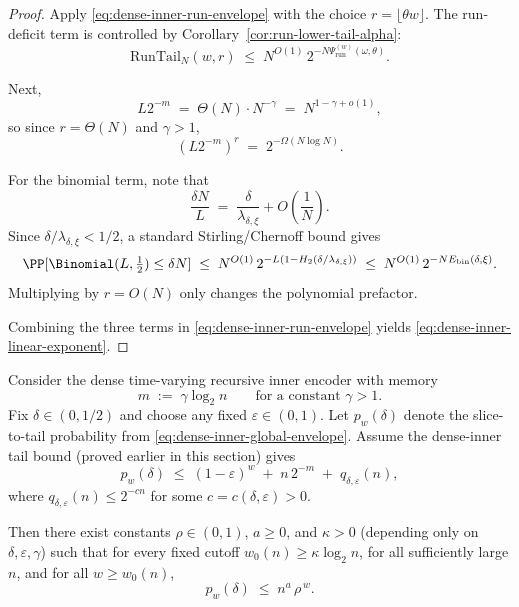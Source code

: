 \begin{proof}
Apply \eqref{eq:dense-inner-run-envelope} with the choice $r=\lfloor \theta w\rfloor$.
The run-deficit term is controlled by Corollary~\ref{cor:run-lower-tail-alpha}:
\[
\mathrm{RunTail}_N(w,r)
\;\le\;
N^{O(1)}\,2^{-N\Psi_{\mathrm{run}}^{(w)}(\omega,\theta)}.
\]

Next,
\[
L2^{-m}
\;=\;
\Theta(N)\cdot N^{-\gamma}
\;=\;
N^{1-\gamma+o(1)},
\]
so since $r=\Theta(N)$ and $\gamma>1$,
\[
(L2^{-m})^r
\;=\;
2^{-\Omega(N\log N)}.
\]

For the binomial term, note that
\[
\frac{\delta N}{L}
\;=\;
\frac{\delta}{\lambda_{\delta,\xi}}+O\!\left(\frac{1}{N}\right).
\]
Since \(\delta/\lambda_{\delta,\xi}<1/2\), a standard Stirling/Chernoff bound gives
\[
\PP[\Binomial(L,\tfrac12)\le \delta N]
\;\le\;
N^{O(1)}\,2^{-L\left(1-H_2(\delta/\lambda_{\delta,\xi})\right)}
\;\le\;
N^{O(1)}\,2^{-N E_{\mathrm{bin}}(\delta,\xi)}.
\]
Multiplying by $r=O(N)$ only changes the polynomial prefactor.

Combining the three terms in \eqref{eq:dense-inner-run-envelope} yields
\eqref{eq:dense-inner-linear-exponent}.
\end{proof}




\begin{corollary}
\label{cor:dense-inner-geometric-cutoff}
Consider the dense time-varying recursive inner encoder with memory
\[
m \;:=\; \gamma \log_2 n
\qquad\text{for a constant }\gamma>1.
\]
Fix $\delta\in(0,1/2)$ and choose any fixed $\varepsilon\in(0,1)$.
Let $p_w(\delta)$ denote the slice-to-tail probability from \eqref{eq:dense-inner-global-envelope}.
Assume the dense-inner tail bound (proved earlier in this section) gives
\begin{equation}
\label{eq:dense-three-term-recall}
p_w(\delta)
\;\le\;
(1-\varepsilon)^w \;+\; n\,2^{-m} \;+\; q_{\delta,\varepsilon}(n),
\end{equation}
where $q_{\delta,\varepsilon}(n)\le 2^{-c n}$ for some $c=c(\delta,\varepsilon)>0$.

Then there exist constants $\rho\in(0,1)$, $a\ge 0$, and $\kappa>0$
(depending only on $\delta,\varepsilon,\gamma$) such that
for every fixed cutoff $w_0(n)\ge \kappa\log_2 n$,
for all sufficiently large $n$, and for all $w\ge w_0(n)$,
\[
p_w(\delta)\;\le\; n^{a}\,\rho^{\,w}.
\]
\end{corollary}

